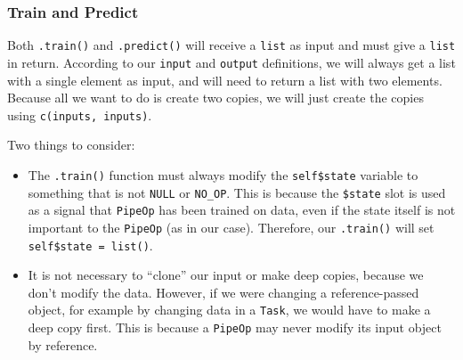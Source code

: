 \documentclass[
]{scrbook}
\newenvironment{Shaded}{\begin{snugshade}}{\end{snugshade}}
\newcommand{\AttributeTok}[1]{\textcolor[rgb]{0.77,0.63,0.00}{#1}}
\newcommand{\CommentTok}[1]{\textcolor[rgb]{0.56,0.35,0.01}{\textit{#1}}}
\newcommand{\ControlFlowTok}[1]{\textcolor[rgb]{0.13,0.29,0.53}{\textbf{#1}}}
\newcommand{\FunctionTok}[1]{\textcolor[rgb]{0.00,0.00,0.00}{#1}}
\newcommand{\NormalTok}[1]{#1}
\newcommand{\OtherTok}[1]{\textcolor[rgb]{0.56,0.35,0.01}{#1}}
\newcommand{\SpecialCharTok}[1]{\textcolor[rgb]{0.00,0.00,0.00}{#1}}
\newcommand{\StringTok}[1]{\textcolor[rgb]{0.31,0.60,0.02}{#1}}
\renewenvironment{Shaded} {\begin{snugshade}\small} {\end{snugshade}}
\begin{document}
\begin{Shaded}
\end{Shaded}

\hypertarget{train-and-predict}{%
\subsubsection{Train and Predict}\label{train-and-predict}}

Both \texttt{.train()} and \texttt{.predict()} will receive a \texttt{list} as input and must give a \texttt{list} in return.
According to our \texttt{input} and \texttt{output} definitions, we will always get a list with a single element as input, and will need to return a list with two elements. Because all we want to do is create two copies, we will just create the copies using \texttt{c(inputs,\ inputs)}.

Two things to consider:

\begin{itemize}
\item
  The \texttt{.train()} function must always modify the \texttt{self\$state} variable to something that is not \texttt{NULL} or \texttt{NO\_OP}.
  This is because the \texttt{\$state} slot is used as a signal that \texttt{PipeOp} has been trained on data, even if the state itself is not important to the \texttt{PipeOp} (as in our case).
  Therefore, our \texttt{.train()} will set \texttt{self\$state\ =\ list()}.
\item
  It is not necessary to ``clone'' our input or make deep copies, because we don't modify the data.
  However, if we were changing a reference-passed object, for example by changing data in a \texttt{Task}, we would have to make a deep copy first.
  This is because a \texttt{PipeOp} may never modify its input object by reference.
\end{itemize}
\end{document}
